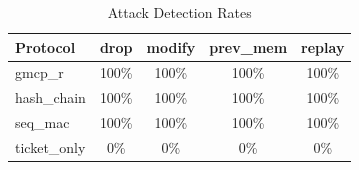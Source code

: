 \begin{table}[t]
\centering
\caption{Attack Detection Rates}
\begin{tabular}{lcccc}
\toprule
Protocol & drop & modify & prev_mem & replay \\
\midrule
gmcp_r & 100\% & 100\% & 100\% & 100\% \\
hash_chain & 100\% & 100\% & 100\% & 100\% \\
seq_mac & 100\% & 100\% & 100\% & 100\% \\
ticket_only & 0\% & 0\% & 0\% & 0\% \\
\bottomrule
\end{tabular}
\label{tab:detection_rates}
\end{table}